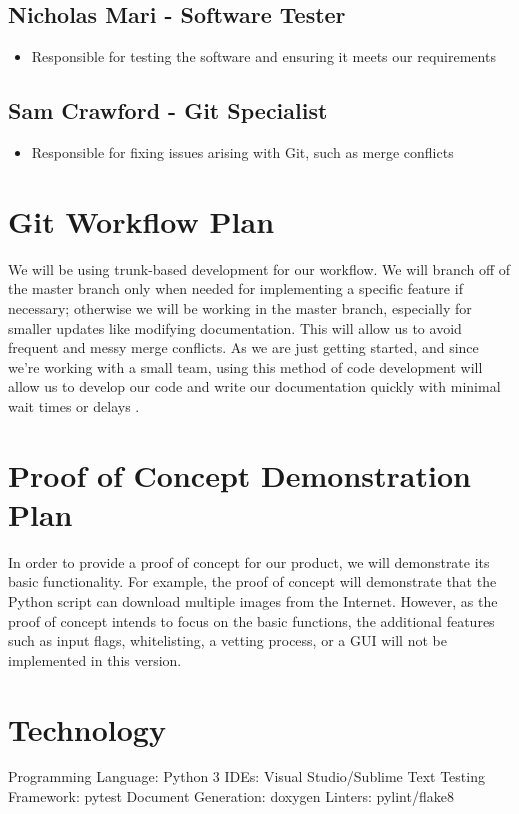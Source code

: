 \documentclass{article}
\begin{document}
\subsection{Nicholas Mari - Software Tester}
\begin{itemize}
\item Responsible for testing the software and ensuring it meets our requirements
\end{itemize}

\subsection{Sam Crawford - Git Specialist}
\begin{itemize}
\item Responsible for fixing issues arising with Git, such as merge conflicts 
\end{itemize}

\section{Git Workflow Plan}
We will be using trunk-based development for our workflow. We will branch off 
of the master branch only when needed for implementing a specific feature if 
necessary; otherwise we will be working in the master branch, especially for 
smaller updates like modifying documentation. This will allow us to avoid 
frequent and messy merge conflicts. As we are just getting started, and since 
we’re working with a small team, using this method of code development will 
allow us to develop our code and write our documentation quickly with minimal 
wait times or delays \cite{trunkbased}.

\section{Proof of Concept Demonstration Plan}
In order to provide a proof of concept for our product, we will demonstrate its 
basic functionality. For example, the proof of concept will demonstrate that the 
Python script can download multiple images from the Internet. However, as the 
proof of concept intends to focus on the basic functions, the additional 
features such as input flags, whitelisting, a vetting process, or a GUI will not 
be implemented in this version.

\section{Technology}
Programming Language: Python 3
IDEs: Visual Studio/Sublime Text
Testing Framework: pytest
Document Generation: doxygen
Linters: pylint/flake8
\end{document}
